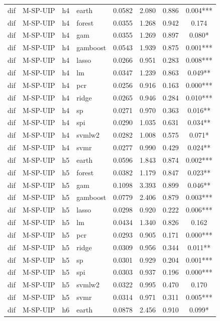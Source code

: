 \begin{ThreePartTable}
\begin{longtable}[t]{llclcccc}
\addlinespace
dif & M-SP-UIP & h4 & earth & 0.0582 & 2.080 & 0.886 & 0.004***\\
dif & M-SP-UIP & h4 & forest & 0.0355 & 1.268 & 0.942 & 0.174\\
dif & M-SP-UIP & h4 & gam & 0.0355 & 1.269 & 0.897 & 0.080*\\
dif & M-SP-UIP & h4 & gamboost & 0.0543 & 1.939 & 0.875 & 0.001***\\
dif & M-SP-UIP & h4 & lasso & 0.0266 & 0.951 & 0.283 & 0.008***\\
dif & M-SP-UIP & h4 & lm & 0.0347 & 1.239 & 0.863 & 0.049**\\
dif & M-SP-UIP & h4 & pcr & 0.0256 & 0.916 & 0.163 & 0.000***\\
dif & M-SP-UIP & h4 & ridge & 0.0265 & 0.946 & 0.284 & 0.010***\\
dif & M-SP-UIP & h4 & sp & 0.0271 & 0.970 & 0.363 & 0.016**\\
dif & M-SP-UIP & h4 & spi & 0.0290 & 1.035 & 0.631 & 0.034**\\
dif & M-SP-UIP & h4 & svmlw2 & 0.0282 & 1.008 & 0.575 & 0.071*\\
dif & M-SP-UIP & h4 & svmr & 0.0277 & 0.990 & 0.429 & 0.024**\\
\addlinespace
dif & M-SP-UIP & h5 & earth & 0.0596 & 1.843 & 0.874 & 0.002***\\
dif & M-SP-UIP & h5 & forest & 0.0382 & 1.179 & 0.847 & 0.023**\\
dif & M-SP-UIP & h5 & gam & 0.1098 & 3.393 & 0.899 & 0.046**\\
dif & M-SP-UIP & h5 & gamboost & 0.0779 & 2.406 & 0.879 & 0.003***\\
dif & M-SP-UIP & h5 & lasso & 0.0298 & 0.920 & 0.222 & 0.006***\\
dif & M-SP-UIP & h5 & lm & 0.0434 & 1.340 & 0.826 & 0.162\\
dif & M-SP-UIP & h5 & pcr & 0.0293 & 0.905 & 0.171 & 0.000***\\
dif & M-SP-UIP & h5 & ridge & 0.0309 & 0.956 & 0.344 & 0.011**\\
dif & M-SP-UIP & h5 & sp & 0.0301 & 0.929 & 0.204 & 0.001***\\
dif & M-SP-UIP & h5 & spi & 0.0303 & 0.937 & 0.196 & 0.000***\\
dif & M-SP-UIP & h5 & svmlw2 & 0.0322 & 0.995 & 0.470 & 0.170\\
dif & M-SP-UIP & h5 & svmr & 0.0314 & 0.971 & 0.311 & 0.005***\\
\addlinespace
dif & M-SP-UIP & h6 & earth & 0.0878 & 2.456 & 0.910 & 0.099*\\

\end{longtable}
\end{ThreePartTable}
